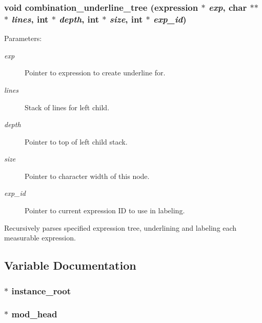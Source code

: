 \subsubsection{\setlength{\rightskip}{0pt plus 5cm}void combination\_\-underline\_\-tree ({\bf expression} $\ast$ {\em exp}, char $\ast$$\ast$$\ast$ {\em lines}, int $\ast$ {\em depth}, int $\ast$ {\em size}, int $\ast$ {\em exp\_\-id})}\label{comb_8c_a6}


\begin{Desc}
\item[Parameters: ]\par
\begin{description}
\item[{\em 
exp}]Pointer to expression to create underline for. \item[{\em 
lines}]Stack of lines for left child. \item[{\em 
depth}]Pointer to top of left child stack. \item[{\em 
size}]Pointer to character width of this node. \item[{\em 
exp\_\-id}]Pointer to current expression ID to use in labeling.\end{description}
\end{Desc}
Recursively parses specified expression tree, underlining and labeling each measurable expression. 

\subsection{Variable Documentation}
\subsubsection{$\ast$ instance\_\-root}\label{comb_8c_a0}


\subsubsection{$\ast$ mod\_\-head}\label{comb_8c_a1}


